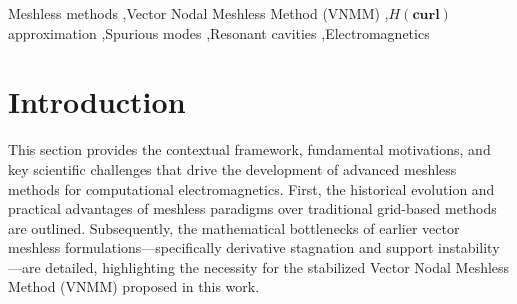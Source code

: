 \documentclass[preprint,12pt]{elsarticle}
\begin{document}
\begin{frontmatter}


    \begin{keyword}
        Meshless methods \sep Vector Nodal Meshless Method (VNMM) \sep $H(\mathbf{curl})$ approximation \sep Spurious modes \sep Resonant cavities \sep Electromagnetics


    \end{keyword}

\end{frontmatter}


\section{Introduction}
\label{sec:intro}

This section provides the contextual framework, fundamental motivations, and key scientific challenges that drive the development of advanced meshless methods for computational electromagnetics. First, the historical evolution and practical advantages of meshless paradigms over traditional grid-based methods are outlined. Subsequently, the mathematical bottlenecks of earlier vector meshless formulations---specifically derivative stagnation and support instability---are detailed, highlighting the necessity for the stabilized Vector Nodal Meshless Method (VNMM) proposed in this work.
\end{document}
